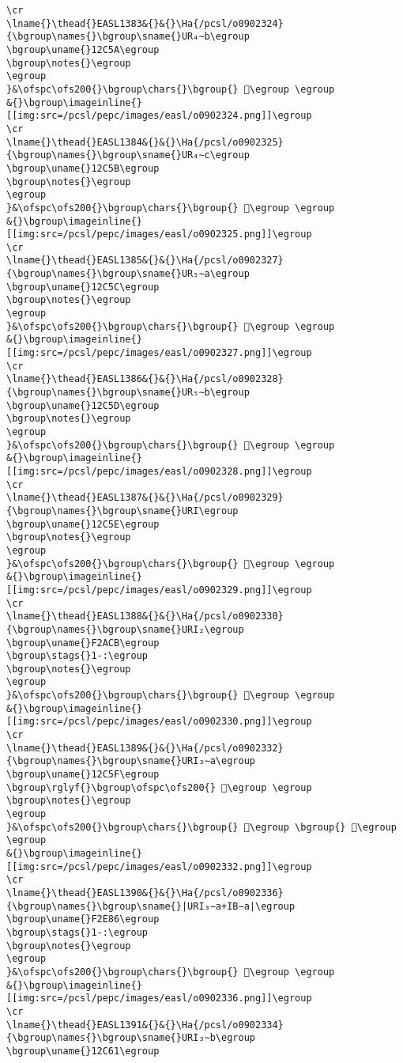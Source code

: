 \begin{verbatim}
\cr
\lname{}\thead{}EASL1383&{}&{}\Ha{/pcsl/o0902324}{\bgroup\names{}\bgroup\sname{}UR₄∼b\egroup
\bgroup\uname{}12C5A\egroup
\bgroup\notes{}\egroup
\egroup
}&\ofspc\ofs200{}\bgroup\chars{}\bgroup{} 𒱚\egroup \egroup
&{}\bgroup\imageinline{}[[img:src=/pcsl/pepc/images/easl/o0902324.png]]\egroup
\cr
\lname{}\thead{}EASL1384&{}&{}\Ha{/pcsl/o0902325}{\bgroup\names{}\bgroup\sname{}UR₄∼c\egroup
\bgroup\uname{}12C5B\egroup
\bgroup\notes{}\egroup
\egroup
}&\ofspc\ofs200{}\bgroup\chars{}\bgroup{} 𒱛\egroup \egroup
&{}\bgroup\imageinline{}[[img:src=/pcsl/pepc/images/easl/o0902325.png]]\egroup
\cr
\lname{}\thead{}EASL1385&{}&{}\Ha{/pcsl/o0902327}{\bgroup\names{}\bgroup\sname{}UR₅∼a\egroup
\bgroup\uname{}12C5C\egroup
\bgroup\notes{}\egroup
\egroup
}&\ofspc\ofs200{}\bgroup\chars{}\bgroup{} 𒱜\egroup \egroup
&{}\bgroup\imageinline{}[[img:src=/pcsl/pepc/images/easl/o0902327.png]]\egroup
\cr
\lname{}\thead{}EASL1386&{}&{}\Ha{/pcsl/o0902328}{\bgroup\names{}\bgroup\sname{}UR₅∼b\egroup
\bgroup\uname{}12C5D\egroup
\bgroup\notes{}\egroup
\egroup
}&\ofspc\ofs200{}\bgroup\chars{}\bgroup{} 𒱝\egroup \egroup
&{}\bgroup\imageinline{}[[img:src=/pcsl/pepc/images/easl/o0902328.png]]\egroup
\cr
\lname{}\thead{}EASL1387&{}&{}\Ha{/pcsl/o0902329}{\bgroup\names{}\bgroup\sname{}URI\egroup
\bgroup\uname{}12C5E\egroup
\bgroup\notes{}\egroup
\egroup
}&\ofspc\ofs200{}\bgroup\chars{}\bgroup{} 𒱞\egroup \egroup
&{}\bgroup\imageinline{}[[img:src=/pcsl/pepc/images/easl/o0902329.png]]\egroup
\cr
\lname{}\thead{}EASL1388&{}&{}\Ha{/pcsl/o0902330}{\bgroup\names{}\bgroup\sname{}URI₂\egroup
\bgroup\uname{}F2ACB\egroup
\bgroup\stags{}1-:\egroup
\bgroup\notes{}\egroup
\egroup
}&\ofspc\ofs200{}\bgroup\chars{}\bgroup{} 󲫋\egroup \egroup
&{}\bgroup\imageinline{}[[img:src=/pcsl/pepc/images/easl/o0902330.png]]\egroup
\cr
\lname{}\thead{}EASL1389&{}&{}\Ha{/pcsl/o0902332}{\bgroup\names{}\bgroup\sname{}URI₃∼a\egroup
\bgroup\uname{}12C5F\egroup
\bgroup\rglyf{}\bgroup\ofspc\ofs200{} 𒱟\egroup \egroup
\bgroup\notes{}\egroup
\egroup
}&\ofspc\ofs200{}\bgroup\chars{}\bgroup{} 𒱟\egroup \bgroup{} 𒱠\egroup \egroup
&{}\bgroup\imageinline{}[[img:src=/pcsl/pepc/images/easl/o0902332.png]]\egroup
\cr
\lname{}\thead{}EASL1390&{}&{}\Ha{/pcsl/o0902336}{\bgroup\names{}\bgroup\sname{}|URI₃∼a+IB∼a|\egroup
\bgroup\uname{}F2E86\egroup
\bgroup\stags{}1-:\egroup
\bgroup\notes{}\egroup
\egroup
}&\ofspc\ofs200{}\bgroup\chars{}\bgroup{} 󲺆\egroup \egroup
&{}\bgroup\imageinline{}[[img:src=/pcsl/pepc/images/easl/o0902336.png]]\egroup
\cr
\lname{}\thead{}EASL1391&{}&{}\Ha{/pcsl/o0902334}{\bgroup\names{}\bgroup\sname{}URI₃∼b\egroup
\bgroup\uname{}12C61\egroup

\end{verbatim}

